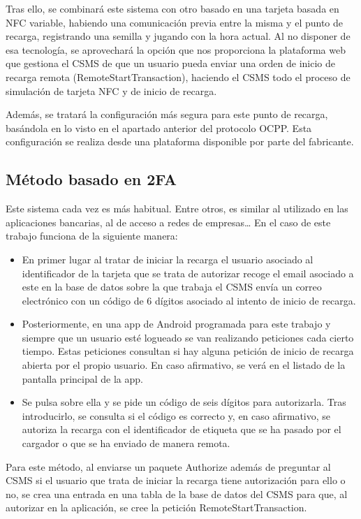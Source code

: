 \documentclass[12pt,a4paper,onecolumn,oneside]{report}
\begin{document}
Tras ello, se combinará este sistema con otro basado en una tarjeta basada en NFC variable, habiendo una comunicación previa entre la misma y el punto de recarga, registrando una semilla y jugando con la hora actual. Al no disponer de esa tecnología, se aprovechará la opción que nos proporciona la plataforma web que gestiona el CSMS de que un usuario pueda enviar una orden de inicio de recarga remota (RemoteStartTransaction), haciendo el CSMS todo el proceso de simulación de tarjeta NFC y de inicio de recarga.

Además, se tratará la configuración más segura para este punto de recarga, basándola en lo visto en el apartado anterior del protocolo OCPP. Esta configuración se realiza desde una plataforma disponible por parte del fabricante.

\subsection{Método basado en 2FA}

Este sistema cada vez es más habitual. Entre otros, es similar al utilizado en las aplicaciones bancarias, al de acceso a redes de empresas… En el caso de este trabajo funciona de la siguiente manera:

\begin{itemize}
\item En primer lugar al tratar de iniciar la recarga el usuario asociado al identificador de la tarjeta que se trata de autorizar recoge el email asociado a este en la base de datos sobre la que trabaja el CSMS envía un correo electrónico con un código de 6 dígitos asociado al intento de inicio de recarga.
\item Posteriormente, en una app de Android programada para este trabajo y siempre que un usuario esté logueado se van realizando peticiones cada cierto tiempo. Estas peticiones consultan si hay alguna petición de inicio de recarga abierta por el propio usuario. En caso afirmativo, se verá en el listado de la pantalla principal de la app. 
\item Se pulsa sobre ella y se pide un código de seis dígitos para autorizarla. Tras introducirlo, se consulta si el código es correcto y, en caso afirmativo, se autoriza la recarga con el identificador de etiqueta que se ha pasado por el cargador o que se ha enviado de manera remota.
\end{itemize}

Para este método, al enviarse un paquete Authorize además de preguntar al CSMS si el usuario que trata de iniciar la recarga tiene autorización para ello o no, se crea una entrada en una tabla de la base de datos del CSMS para que, al autorizar en la aplicación, se cree la petición RemoteStartTransaction.
\end{document}
